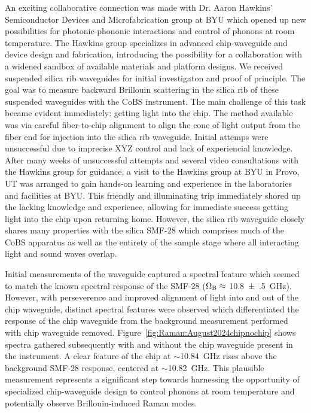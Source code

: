 An exciting collaborative connection was made with Dr. Aaron Hawkins' Semiconductor Devices and Microfabrication group at \ac{BYU} which opened up new possibilities for photonic-phononic interactions and control of phonons at room temperature. The Hawkins group specializes in advanced chip-waveguide and device design and fabrication, introducing the possibility for a collaboration with a widened sandbox of available materials and platform designs. We received suspended silica rib waveguides for initial investigaton and proof of principle. The goal was to measure backward Brillouin scattering in the silica rib of these suspended waveguides with the \ac{CoBS} instrument. The main challenge of this task became evident immediately: getting light into the chip. The method available was via careful fiber-to-chip alignment to align the cone of light output from the fiber end for injection into the silica rib waveguide. Initial attemps were unsuccessful due to imprecise XYZ control and lack of experiencial knowledge. After many weeks of unsuccessful attempts and several video consultations with the Hawkins group for guidance, a visit to the Hawkins group at \ac{BYU} in Provo, UT was arranged to gain hands-on learning and experience in the laboratories and facilities at \ac{BYU}. This friendly and illuminating trip immediately shored up the lacking knowledge and experience, allowing for immediate success getting light into the chip upon returning home. However, the silica rib waveguide closely shares many properties with the silica \ac{SMF-28} which comprises much of the \ac{CoBS} apparatus as well as the entirety of the sample stage where all interacting light and sound waves overlap.

Initial measurements of the waveguide captured a spectral feature which seemed to match the known spectral response of the \ac{SMF-28} (\(\Omega_{\rm B} \approx\) \SI{10.8(5)}{\giga\hertz}). However, with perseverence and improved alignment of light into and out of the chip waveguide, distinct spectral features were observed which differentiated the response of the chip waveguide from the background measurement performed with chip waveguide removed. Figure~\ref{fig:Raman:August2024chipnochip} shows spectra gathered subsequently with and without the chip waveguide present in the instrument. A clear feature of the chip at \(\sim\)\SI{10.84}{\giga\hertz} rises above the background \ac{SMF-28} response, centered at \(\sim\)\SI{10.82}{\giga\hertz}. This plausible measurement represents a significant step towards harnessing the opportunity of specialized chip-waveguide design to control phonons at room temperature and potentially observe Brillouin-induced Raman modes.

